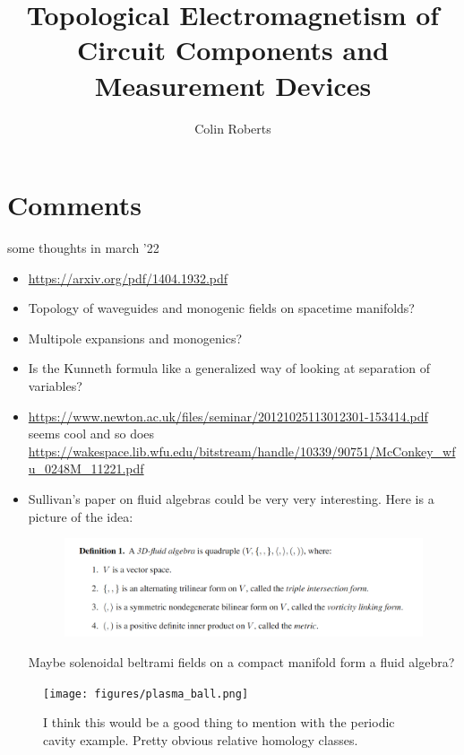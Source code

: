 \documentclass{article}
\title{Topological Electromagnetism of Circuit Components and Measurement Devices}
\author{Colin Roberts}
\begin{document}
\maketitle

\section*{Comments}
some thoughts in march '22
\begin{itemize}
    \item \url{https://arxiv.org/pdf/1404.1932.pdf}
    \item Topology of waveguides and monogenic fields on spacetime manifolds?
    \item Multipole expansions and monogenics?
    \item Is the Kunneth formula like a generalized way of looking at separation of variables?
    \item \url{https://www.newton.ac.uk/files/seminar/20121025113012301-153414.pdf} seems cool and so does \url{https://wakespace.lib.wfu.edu/bitstream/handle/10339/90751/McConkey_wfu_0248M_11221.pdf}
    \item Sullivan's paper on fluid algebras could be very very interesting. Here is a picture of the idea:
    \begin{figure}[H]
        \centering
        \includegraphics{figures/fluid_algebra.png}
    \end{figure}
    Maybe solenoidal beltrami fields on a compact manifold form a fluid algebra?
\end{itemize}
\begin{figure}
    \centering
    \texttt{[image: figures/plasma\_ball.png]}
    \caption{I think this would be a good thing to mention with the periodic cavity example. Pretty obvious relative homology classes.}
\end{figure}
\end{document}
